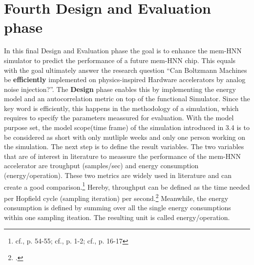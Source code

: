 \section{Fourth Design and Evaluation phase}
In this final Design and Evaluation phase the goal is to enhance the \ac{mem-HNN} simulator to
predict the performance of a future \ac{mem-HNN} chip.
This equals with the goal ultimately answer the research question ``Can Boltzmann Machines be \textbf{efficiently} implemented on physics-inspired
Hardware accelerators by analog noise injection?''.
The \textbf{Design} phase enables this by implementing the energy model and an autocorrelation metric on top of the functional Simulator.
Since the key word is efficiently, this happens in the methodology of a simulation, which requires to specify the parameters meassured for evaluation.
With the model purpose set, the model scope(time frame) of the simulation introduced in 3.4 is to be considered as short with only mutliple weeks and only one person working on the simulation. 
The next step is to define the result variables. The two variables that are of interest in literature to meassure the performance of the
\ac{mem-HNN} accelerator are troughput (samples/sec) and energy consumption (energy/operation). 
These two metrics are widely used in literature and can create a good comparison.\footnote{cf.\cite{bellettiJanusFPGABasedSystem2009}, p. 54-55; cf.\cite{aaditAcceleratingAdaptiveParallel2023}, p. 1-2; cf.\cite{ortega-zamoranoFPGAHardwareAcceleration2016}, p. 16-17}
Hereby, throughput can be defined as the time needed per Hopfield cycle (sampling iteration) per second.\footcite[cf.][6-7]{bohmNoiseinjectedAnalogIsing2022} 
Meanwhile, the energy consumption is defined by summing over all the single energy consumptions within one sampling iteation.
The resulting unit is called energy/operation. 

